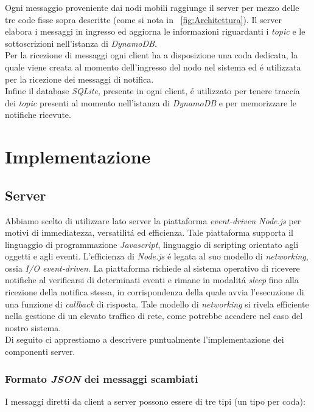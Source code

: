 \documentclass{article}
\begin{document}
Ogni messaggio proveniente dai nodi mobili raggiunge il server per mezzo delle tre code fisse sopra descritte (come si nota in \figurename{~\ref{fig:Architettura}}). Il server elabora i messaggi in ingresso ed aggiorna le informazioni riguardanti i \textit{topic} e le sottoscrizioni nell'istanza di \textit{DynamoDB}.
\\
Per la ricezione di messaggi ogni client ha a disposizione una coda dedicata, la quale viene creata al momento dell'ingresso del nodo nel sistema ed \'e utilizzata per la ricezione dei messaggi di notifica.
\\
Infine il database \textit{SQLite}, presente in ogni client, \'e utilizzato per tenere traccia dei \textit{topic} presenti al momento nell'istanza di \textit{DynamoDB} e per memorizzare le notifiche ricevute.

\section{Implementazione}

\subsection{Server}
Abbiamo scelto di utilizzare lato server la piattaforma \textit{event-driven Node.js} per motivi di immediatezza, versatilit\'a  ed efficienza. Tale piattaforma supporta il linguaggio di programmazione \textit{Javascript}, linguaggio di scripting orientato agli oggetti e agli eventi. L'efficienza di \textit{Node.js} \'e legata al suo modello di \textit{networking}, ossia \textit{I/O event-driven}. La piattaforma richiede al sistema operativo di ricevere notifiche al verificarsi di determinati eventi e rimane in modalit\'a \textit{sleep} fino alla ricezione della notifica stessa, in corrispondenza della quale avvia l'esecuzione di una funzione di \textit{callback} di risposta. Tale modello di \textit{networking} si rivela efficiente nella gestione di un elevato traffico di rete, come potrebbe accadere nel caso del nostro sistema.
\\
Di seguito ci apprestiamo a descrivere puntualmente l'implementazione dei componenti server.

\subsubsection{Formato \textit{JSON} dei messaggi scambiati}

I messaggi diretti da client a server possono essere di tre tipi (un tipo per coda):
\end{document}
